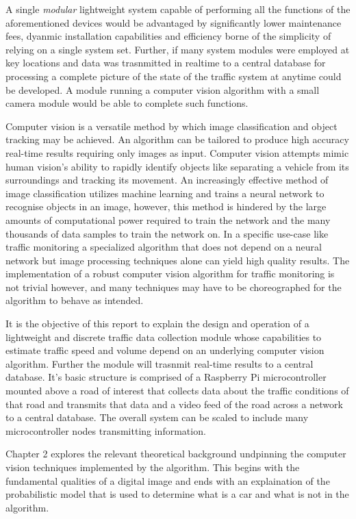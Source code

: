 A single \emph{modular} lightweight system capable of performing all the functions of the aforementioned devices would be advantaged by significantly lower maintenance fees, dyanmic installation capabilities and efficiency borne of the simplicity of relying on a single system set. Further, if many system modules were employed at key locations and data was trasnmitted in realtime to a central database for processing a complete picture of the state of the traffic system at anytime could be developed. A module running a computer vision algorithm with a small camera module would be able to complete such functions. 

Computer vision is a versatile method by which image classification and object tracking may be achieved. An algorithm can be tailored to produce high accuracy real-time results requiring only images as input. Computer vision attempts mimic human vision's ability to rapidly identify objects like separating a vehicle from its surroundings and tracking its movement. An increasingly effective method of image classification utilizes machine learning and trains a neural network to recognise objects in an image, however, this method is hindered by the large amounts of computational power required to train the network and the many thousands of data samples to train the network on. In a specific use-case like traffic monitoring a specialized algorithm that does not depend on a neural network but image processing techniques alone can yield high quality results. The implementation of a robust computer vision algorithm for traffic monitoring is not trivial however, and many techniques may have to be choreographed for the algorithm to behave as intended.

It is the objective of this report to explain the design and operation of a lightweight and discrete traffic data collection module whose capabilities to estimate traffic speed and volume depend on an underlying computer vision algorithm. Further the module will trasnmit real-time results to a central database. It's basic structure is comprised of a Raspberry Pi microcontroller mounted above a road of interest that collects data about the traffic conditions of that road and transmits that data and a video feed of the road across a network to a central database. The overall system can be scaled to include many microcontroller nodes transmitting information. 

Chapter 2 explores the relevant theoretical background undpinning the computer vision techniques implemented by the algorithm. This begins with the fundamental qualities of a digital image and ends with an explaination of the probabilistic model that is used to determine what is a car and what is not in the algorithm. 

